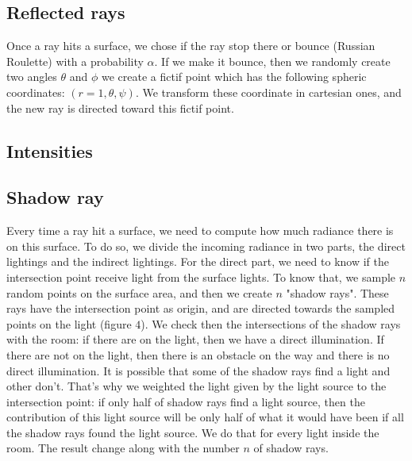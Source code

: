 \documentclass[12pt]{article}
\numberwithin{equation}{section}
\begin{document}
\subsection{Reflected rays}
Once a ray hits a surface, we chose if the ray stop there or bounce (Russian Roulette) with a probability $\alpha$. If we make it bounce, then we randomly create two angles $\theta$ and $\phi$ we create a fictif point which has the following spheric coordinates: $(r=1, \theta, \psi)$. We transform these coordinate in cartesian ones, and the new ray is directed toward this fictif point.

\subsection{Intensities}

\subsection{Shadow ray}

Every time a ray hit a surface, we need to compute how much radiance there is on this surface. To do so, we divide the incoming radiance in two parts, the direct lightings and the indirect lightings. For the direct part, we need to know if the intersection point receive light from the surface lights. To know that, we sample $n$ random points on the surface area, and then we create $n$ "shadow rays". These rays have the intersection point as origin, and are directed towards the sampled points on the light (figure $4$). We check then the intersections of the shadow rays with the room: if there are on the light, then we have a direct illumination. If there are not on the light, then there is an obstacle on the way and there is no direct illumination. It is possible that some of the shadow rays find a light and other don't. That's why we weighted the light given by the light source to the intersection point: if only half of shadow rays find a light source, then the contribution of this light source will be only half of what it would have been if all the shadow rays found the light source. We do that for every light inside the room. The result change along with the number $n$ of shadow rays.
\end{document}
